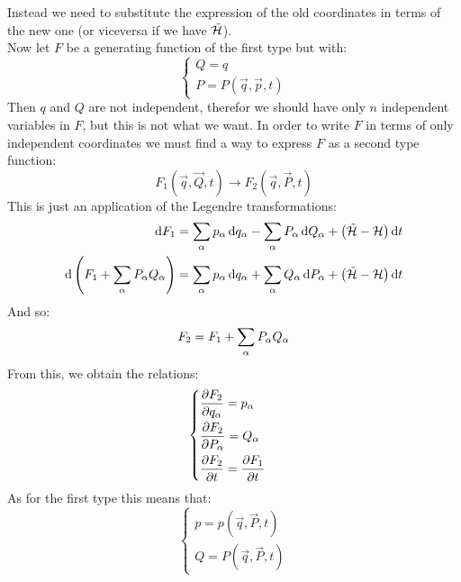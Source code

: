Instead we need to substitute the expression of the old coordinates in terms of the new one (or viceversa if we have $\tilde{\mathcal{H}}$).\\
Now let $F$ be a generating function of the first type but with:
\begin{equation}
    \begin{cases}
        Q = q\\
        P = P(\vec{q},\vec{p},t)
    \end{cases}
\end{equation}
Then $q$ and $Q$ are not independent, therefor we should have only $n$ independent variables in $F$, but this is not what we want. In order to write $F$ in terms of only independent coordinates we must find a way to express $F$ as a second type function:
\begin{equation}
    F_1(\vec{q},\vec{Q},t) \longrightarrow F_2(\vec{q},\vec{P},t)
\end{equation}
This is just an application of the Legendre transformations:
\begin{equation}
    \begin{split}
        \dd{F_1} &= \displaystyle\sum_{\alpha}p_{\alpha}\dd{q_{\alpha}} - \displaystyle\sum_{\alpha}P_{\alpha}\dd{Q_{\alpha}} + \left(\tilde{\mathcal{H}}- \mathcal{H}\right)\dd{t}\\
        \dd{\left(F_1 + \displaystyle\sum_{\alpha}P_{\alpha}Q_{\alpha}\right)} &= \displaystyle\sum_{\alpha}p_{\alpha}\dd{q_{\alpha}}  + \displaystyle\sum_{\alpha}Q_{\alpha}\dd{P_{\alpha}} + \left(\tilde{\mathcal{H}}- \mathcal{H}\right)\dd{t}
    \end{split}
\end{equation}
And so:
\begin{equation}
    F_2 = F_1 + \displaystyle\sum_{\alpha}P_{\alpha}Q_{\alpha}
\end{equation}
From this, we obtain the relations:
\begin{equation}
    \begin{cases}
        \pdv{F_2}{q_{\alpha}} = p_{\alpha}\\[8pt]
        \pdv{F_2}{P_{\alpha}} = Q_{\alpha}\\[8pt]
        \pdv{F_2}{t} = \pdv{F_1}{t}
    \end{cases}
\end{equation}
As for the first type this means that:
\begin{equation}
    \begin{cases}
        p = p(\vec{q},\vec{P},t)\\
        Q = P(\vec{q},\vec{P},t)
    \end{cases}
\end{equation}
